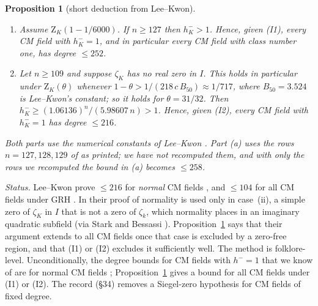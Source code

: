 \documentclass[11pt]{amsart}
\newtheorem{proposition}[theorem]{Proposition}
\theoremstyle{definition}
\theoremstyle{remark}
\newcommand{\Zt}{\mathrm{Z}}       %
\begin{document}
\begin{proposition}[short deduction from Lee--Kwon]\label{prop:E}
\begin{enumerate}[label=(\alph*)]
\item Assume $\Zt_K(1-1/6000)$. If $n\ge127$ then $h_K^->1$. Hence, given (I1), every CM field with $h^-_K=1$, and in
  particular every CM field with class number one, has degree $\le252$.
\item Let $n\ge109$ and suppose $\zeta_K$ has no real zero in $I$. This holds in particular under $\Zt_K(\theta)$
  whenever $1-\theta>1/(218\,c\,B_{50})\approx1/717$, where $B_{50}=3.524$ is Lee--Kwon's constant; so it holds for
  $\theta=31/32$. Then $h^-_K\ge(1.06136)^n/(5.98607\,n)>1$. Hence, given (I2), every CM field with $h^-_K=1$ has
  degree $\le216$.
\end{enumerate}
Both parts use the numerical constants of Lee--Kwon \cite[Tables~1 and~7]{LK}. Part (a) uses the rows $n=127,128,129$
of \cite[Table~7]{LK} as printed; we have not recomputed them, and with only the rows we recomputed the bound in (a)
becomes $\le258$.
\end{proposition}

\emph{Status.} Lee--Kwon prove $\le216$ for \emph{normal} CM fields \cite[Thm.~1(2)]{LK}, and $\le104$ for all CM
fields under GRH \cite[Thm.~1(3)]{LK}. In their proof of \cite[Prop.~8(2)]{LK} normality is used only in case~(ii), a
simple zero of $\zeta_K$ in $I$ that is not a zero of $\zeta_k$, which normality places in an imaginary quadratic
subfield (via Stark \cite{Stark74} and Bessassi \cite{Bes03}). Proposition~\ref{prop:E} says that their argument extends
to all CM fields once that case is excluded by a zero-free region, and that (I1) or (I2) excludes it sufficiently well.
The method is folklore-level. Unconditionally, the degree bounds for CM fields with $h^-=1$ that we know of are for
normal CM fields \cite{Hof79,Bes03,LK}; Proposition~\ref{prop:E} gives a bound for all CM fields under (I1) or
(I2). The record \cite{Bha} (\S34) removes a Siegel-zero hypothesis for CM fields of
fixed degree.
\end{document}
